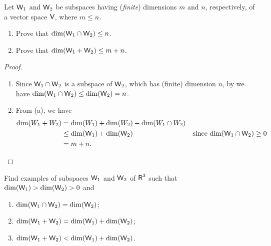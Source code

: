 \begin{exercise} \label{exercise 1.6.31}
Let \(\textsf{W}_1\) and \(\textsf{W}_2\) be subspaces having (\emph{finite}) dimensions \(m\) and \(n\), respectively, of a vector space \(\textsf{V}\), where \(m \le n\).
\begin{enumerate}
\item Prove that \(\dim(\textsf{W}_1 \cap \textsf{W}_2) \le n\).
\item Prove that \(\dim(\textsf{W}_1 + \textsf{W}_2) \le m + n\).
\end{enumerate}
\end{exercise}

\begin{proof} \ 

\begin{enumerate}
\item Since \(\textsf{W}_1 \cap \textsf{W}_2\) is a subspace of \(\textsf{W}_2\), which has (finite) dimension \(n\), by  we have \(\dim(\textsf{W}_1 \cap \textsf{W}_2) \le \dim(\textsf{W}_2) = n\).
\item From (a), we have
    \begin{align*}
        \dim(W_1 + W_2) & = \dim(W_1) + \dim(W_2) - \dim(W_1 \cap W_2) \\
                        & \le \dim(\textsf{W}_1) + \dim(\textsf{W}_2) & \text{since \(\dim(\textsf{W}_1 \cap \textsf{W}_2) \ge 0\)} \\
                        & = m + n.
    \end{align*}
\end{enumerate}
\end{proof}

\begin{exercise} \label{exercise 1.6.32}
Find examples of subspaces \(\textsf{W}_1\) and \(\textsf{W}_2\) of \(\textsf{R}^3\) such that \(\dim(\textsf{W}_1) > \dim(\textsf{W}_2) > 0\) and
\begin{enumerate}
\item \(\dim(\textsf{W}_1 \cap \textsf{W}_2) = \dim(\textsf{W}_2)\);
\item \(\dim(\textsf{W}_1 + \textsf{W}_2) = \dim(\textsf{W}_1) + \dim(\textsf{W}_2)\);
\item \(\dim(\textsf{W}_1 + \textsf{W}_2) < \dim(\textsf{W}_1) + \dim(\textsf{W}_2)\).
\end{enumerate}
\end{exercise}

